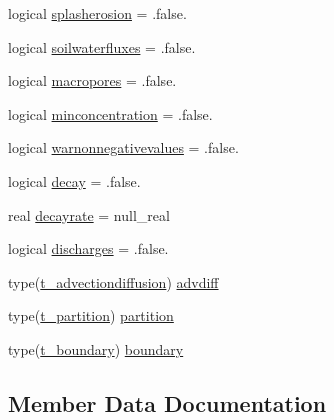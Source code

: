 \begin{DoxyCompactItemize}
logical \mbox{\hyperlink{structmodulerunoffproperties_1_1t__evolution_a7cf2a2c16f062d085e8869ae99a57fb4}{splasherosion}} = .false.
\item 
logical \mbox{\hyperlink{structmodulerunoffproperties_1_1t__evolution_a49a693eea0497d5745041ef0f14bd4b9}{soilwaterfluxes}} = .false.
\item 
logical \mbox{\hyperlink{structmodulerunoffproperties_1_1t__evolution_ab1da0610b774a3c1ef550e07bbb626a4}{macropores}} = .false.
\item 
logical \mbox{\hyperlink{structmodulerunoffproperties_1_1t__evolution_af54e8b2b59328261eb5eb2be83751cf4}{minconcentration}} = .false.
\item 
logical \mbox{\hyperlink{structmodulerunoffproperties_1_1t__evolution_a17231f13e016118ffc35fbcdfcad4f90}{warnonnegativevalues}} = .false.
\item 
logical \mbox{\hyperlink{structmodulerunoffproperties_1_1t__evolution_af173e31544716e06e37ed072e4780d65}{decay}} = .false.
\item 
real \mbox{\hyperlink{structmodulerunoffproperties_1_1t__evolution_a40358ed4d7ade14b8742c836abadd39c}{decayrate}} = null\+\_\+real
\item 
logical \mbox{\hyperlink{structmodulerunoffproperties_1_1t__evolution_af05d1bc146a3bcdeb69653eaafa51812}{discharges}} = .false.
\item 
type(\mbox{\hyperlink{structmodulerunoffproperties_1_1t__advectiondiffusion}{t\+\_\+advectiondiffusion}}) \mbox{\hyperlink{structmodulerunoffproperties_1_1t__evolution_a60c1e9588eb1e7ef825d8437a3f8aa0b}{advdiff}}
\item 
type(\mbox{\hyperlink{structmodulerunoffproperties_1_1t__partition}{t\+\_\+partition}}) \mbox{\hyperlink{structmodulerunoffproperties_1_1t__evolution_a1aeda1892474c2543112b5bbf453d0de}{partition}}
\item 
type(\mbox{\hyperlink{structmodulerunoffproperties_1_1t__boundary}{t\+\_\+boundary}}) \mbox{\hyperlink{structmodulerunoffproperties_1_1t__evolution_aef6e14baed2f788616e322c8191c7a71}{boundary}}
\end{DoxyCompactItemize}


\subsection{Member Data Documentation}
\mbox{\label{structmodulerunoffproperties_1_1t__evolution_a60c1e9588eb1e7ef825d8437a3f8aa0b}} 

